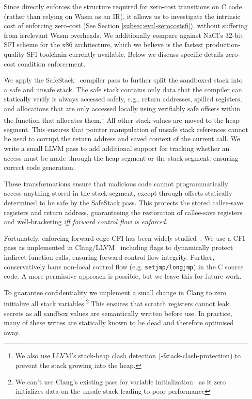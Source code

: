 Since \trsegmentsfi directly enforces the structure required for zero-cost transitions on C code (rather than relying on Wasm as an IR), it allows us to investigate the intrinsic cost of enforcing zero-cost (See Section \ref{subsec:eval-zerocostsfi}), without suffering from irrelevant Wasm overheads.
%
We additionally compare \trsegmentsfi against NaCl's 32-bit SFI scheme for the
x86 architecture, which we believe is the fastest production-quality SFI
toolchain currently available.
%
Below we discuss specific details \trsegmentsfi zero-cost condition enforcement.

%
We apply the SafeStack~\cite{kuznetsov_code-pointer_2014, safestack-llvm} compiler pass to further split the sandboxed stack into a safe and unsafe stack.
%
The safe stack contains only data that the compiler can statically verify is
always accessed safely, e.g., return addresses, spilled registers, and
allocations that are only accessed locally using verifiably safe offsets within
the function that allocates them.\footnote{We also use LLVM's
stack-heap clash detection (\textsf{-fstack-clash-protection}) to prevent
the stack growing into the heap.}
%
All other stack values are moved to the heap segment.
%
This ensures that pointer manipulation of unsafe stack references cannot be used to corrupt the return address and saved context of the current call.
%
We write a small LLVM pass to add additional support for tracking whether an access must be made through the heap segment or the stack segment, ensuring correct code generation.

These transformations ensure that malicious code cannot programmatically access
anything stored in the stack segment, except through offsets statically
determined to be safe by the SafeStack pass.
%
This protects the stored callee-save registers and return address, guaranteeing
the restoration of callee-save registers and well-bracketing \emph{iff forward
control flow is enforced}.

%
Fortunately, enforcing forward-edge CFI has been widely studied~\cite{burow_control-flow_2017}.
%
We use a CFI pass as implemented in Clang/LLVM~\cite{cfi-llvm,
DBLP:conf/uss/TiceRCCELP14} including flags to dynamically protect indirect
function calls, ensuring forward control flow integrity.
%
Further, \trsegmentsfi conservatively bans non-local
control flow (e.g. \texttt{setjmp/longjmp}) in the C source code.
%
A more permissive approach is possible, but we leave this for future work.

%
To guarantee confidentiality we implement a small change in Clang to zero initialize all stack variables.\footnote{We can't use Clang's existing pass
for variable initialization~\cite{stack-var-init-llvm} as it zero initializes data on the unsafe stack leading to poor performance}
%
This ensures that scratch registers cannot leak secrets as all sandbox values
are semantically written before use.
%
In practice, many of these writes are statically known to be dead and therefore optimised away.

